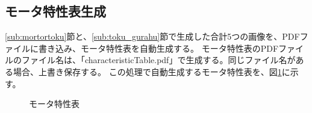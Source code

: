 \subsection{モータ特性表生成}\label{sub:}
\ref{sub:mortortoku}節と、\ref{sub:toku_gurahu}節で生成した合計5つの画像を、PDFファイルに書き込み、モータ特性表を自動生成する。
モータ特性表のPDFファイルのファイル名は、「characteristicTable.pdf」で生成する。同じファイル名がある場合、上書き保存する。
この処理で自動生成するモータ特性表を、図\ref{fig:tokuseihyou}に示す。
\begin{figure}[t]
	\centering
	\caption{モータ特性表}
	\label{fig:tokuseihyou}
\end{figure}